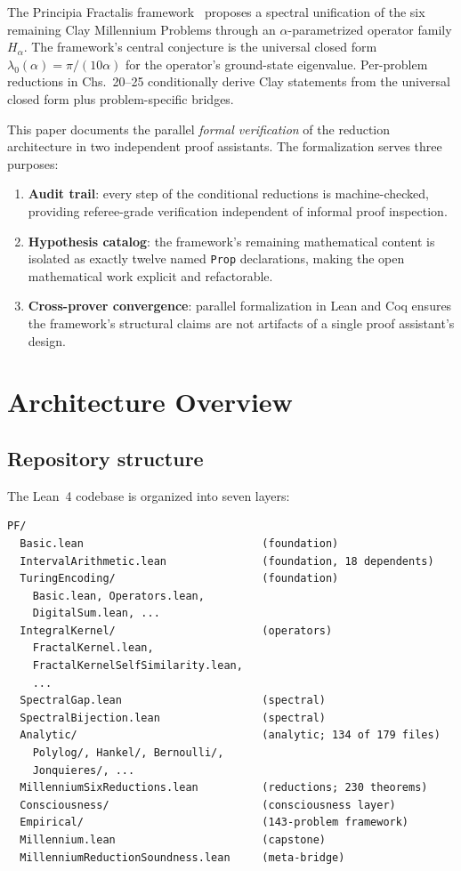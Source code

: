 \documentclass[11pt,a4paper]{article}
\theoremstyle{definition}
\begin{document}
The Principia Fractalis framework~\cite{cohen2025framework} proposes a
spectral unification of the six remaining Clay Millennium Problems
through an $\alpha$-parametrized operator family $H_\alpha$. The
framework's central conjecture is the universal closed form
$\lambda_0(\alpha) = \pi/(10\alpha)$ for the operator's ground-state
eigenvalue. Per-problem reductions in \cite{cohen2025framework}
Chs.~20--25 conditionally derive Clay statements from the universal
closed form plus problem-specific bridges.

This paper documents the parallel \emph{formal verification} of the
reduction architecture in two independent proof assistants. The
formalization serves three purposes:
\begin{enumerate}
\item \textbf{Audit trail}: every step of the conditional reductions is
machine-checked, providing referee-grade verification independent of
informal proof inspection.
\item \textbf{Hypothesis catalog}: the framework's remaining mathematical
content is isolated as exactly twelve named \texttt{Prop} declarations,
making the open mathematical work explicit and refactorable.
\item \textbf{Cross-prover convergence}: parallel formalization in Lean
and Coq ensures the framework's structural claims are not artifacts of
a single proof assistant's design.
\end{enumerate}

\section{Architecture Overview}

\subsection{Repository structure}

The Lean~4 codebase is organized into seven layers:

\begin{lstlisting}
PF/
  Basic.lean                            (foundation)
  IntervalArithmetic.lean               (foundation, 18 dependents)
  TuringEncoding/                       (foundation)
    Basic.lean, Operators.lean,
    DigitalSum.lean, ...
  IntegralKernel/                       (operators)
    FractalKernel.lean,
    FractalKernelSelfSimilarity.lean,
    ...
  SpectralGap.lean                      (spectral)
  SpectralBijection.lean                (spectral)
  Analytic/                             (analytic; 134 of 179 files)
    Polylog/, Hankel/, Bernoulli/,
    Jonquieres/, ...
  MillenniumSixReductions.lean          (reductions; 230 theorems)
  Consciousness/                        (consciousness layer)
  Empirical/                            (143-problem framework)
  Millennium.lean                       (capstone)
  MillenniumReductionSoundness.lean     (meta-bridge)
\end{lstlisting}
\end{document}
